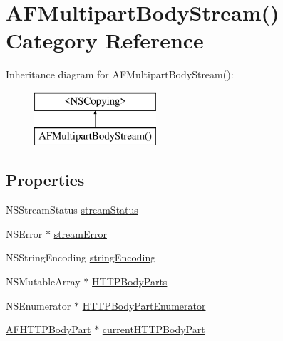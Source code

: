 \hypertarget{category_a_f_multipart_body_stream_07_08}{\section{A\-F\-Multipart\-Body\-Stream() Category Reference}
\label{category_a_f_multipart_body_stream_07_08}
}
Inheritance diagram for A\-F\-Multipart\-Body\-Stream()\-:\begin{figure}[H]
\begin{center}
\leavevmode
\includegraphics[height=2.000000cm]{category_a_f_multipart_body_stream_07_08}
\end{center}
\end{figure}
\subsection*{Properties}
\begin{DoxyCompactItemize}
\item 
N\-S\-Stream\-Status \hyperlink{category_a_f_multipart_body_stream_07_08_ad9f5c15c88c1f3731d0a86d696a39311}{stream\-Status}
\item 
N\-S\-Error $\ast$ \hyperlink{category_a_f_multipart_body_stream_07_08_a9726eb064312c0dce3eb57858ed862a9}{stream\-Error}
\item 
N\-S\-String\-Encoding \hyperlink{category_a_f_multipart_body_stream_07_08_a24375ab1dd4d3576eff24e5c9346c83c}{string\-Encoding}
\item 
N\-S\-Mutable\-Array $\ast$ \hyperlink{category_a_f_multipart_body_stream_07_08_a167d5df6c437a8a93b46de309d067198}{H\-T\-T\-P\-Body\-Parts}
\item 
N\-S\-Enumerator $\ast$ \hyperlink{category_a_f_multipart_body_stream_07_08_a2e5468c86b09e6a3cb14b812155f86ea}{H\-T\-T\-P\-Body\-Part\-Enumerator}
\item 
\hyperlink{interface_a_f_h_t_t_p_body_part}{A\-F\-H\-T\-T\-P\-Body\-Part} $\ast$ \hyperlink{category_a_f_multipart_body_stream_07_08_a95852aefe9011210705d91b29c7fa620}{current\-H\-T\-T\-P\-Body\-Part}
\end{DoxyCompactItemize}


